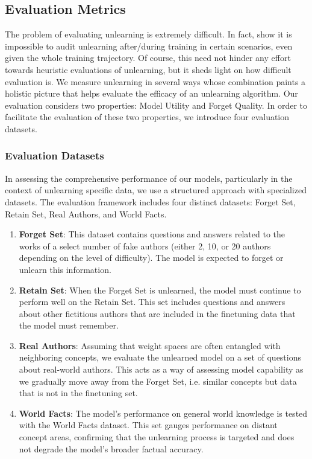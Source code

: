 \subsection{Evaluation Metrics}
\label{sec:eval-metrics}

The problem of evaluating unlearning is extremely difficult.
In fact, \citet{thudi2022necessity} show it is impossible to audit unlearning after/during training in certain scenarios, even given the whole training trajectory. 
Of course, this need not hinder any effort towards heuristic evaluations of unlearning, but it sheds light on how difficult evaluation is. 
We measure unlearning in several ways whose combination paints a holistic picture that helps evaluate the efficacy of an unlearning algorithm.
Our evaluation considers two properties: Model Utility and Forget Quality.
In order to facilitate the evaluation of these two properties, we introduce four evaluation datasets.

\subsubsection{Evaluation Datasets}
\label{subsubsec:eval-datasets}

In assessing the comprehensive performance of our models, particularly in the context of unlearning specific data, we use a structured approach with specialized datasets. 
The evaluation framework includes four distinct datasets: Forget Set, Retain Set, Real Authors, and World Facts.

\begin{enumerate}
    \item \textbf{Forget Set}: This dataset contains questions and answers related to the works of a select number of fake authors (either 2, 10, or 20 authors depending on the level of difficulty). The model is expected to forget or unlearn this information. 
    
    \item \textbf{Retain Set}: When the Forget Set is unlearned, the model must continue to perform well on the Retain Set. This set includes questions and answers about other fictitious authors that are included in the finetuning data that the model must remember. 
    
    \item \textbf{Real Authors}: Assuming that weight spaces are often entangled with neighboring concepts, we evaluate the unlearned model on a set of questions about real-world authors. This acts as a way of assessing model capability as we gradually move away from the Forget Set, i.e. similar concepts but data that is not in the finetuning set.
    
    \item \textbf{World Facts}: The model's performance on general world knowledge is tested with the World Facts dataset. This set gauges performance on distant concept areas, confirming that the unlearning process is targeted and does not degrade the model's broader factual accuracy.

\end{enumerate}

